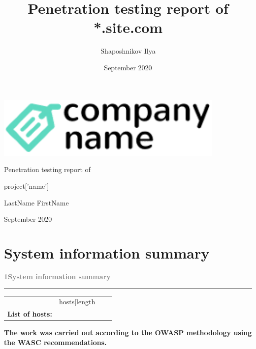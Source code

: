 \documentclass[20px]{extreport}
\title{ Penetration testing report of *.site.com}
\author{ Shaposhnikov Ilya}
\date{September 2020}
\newcommand{\servicename}{ {{project['name']}} } %
\newcommand{\projectauthor}{LastName FirstName} %
\newcommand{\projectdata}{September 2020} %
\newcommand{\projectheader}{Penetration testing }
\newcommand{\projectheader}{Security analysis }
\newcommand{\projectheader}{Security analysis }
\begin{document}
\begin{titlepage}
    \raggedright
	\includegraphics[height=3cm]{company_name.png}
	\center
	\vfill
	\centerline{\Huge }
	\bigskip
	\centerline{\Huge \projectheader report of }
	\bigskip
	\centerline{\Huge \servicename}
	\vfill
	\centerline{\Large \projectauthor}
	\bigskip
	\centerline{\Large \projectdata}

\end{titlepage}



\LARGE\tableofcontents



{\chapter{System information summary}}
    \thispagestyle{fancy}
    \textcolor{gray}{\huge\noindent\bf1\quad\quad System information summary}
    \tiny \newline
    \textcolor{red}{\hrule}
    \Large
    \begin{adjustwidth}{0.2cm}{0.2cm}
        \begin{longtable}[l]{|l p{5cm} | p{5cm} | p{5cm} }
            \noindent {\bf Amount of hosts:} &  {{ hosts|length}} \\
            {\bf List of hosts:} {%
        \end{longtable}
        {\bf The work was carried out according to the OWASP methodology using the WASC recommendations.}
    \end{adjustwidth}
    \bigskip
    \bigskip
    \bigskip
    \bigskip
\end{document}
